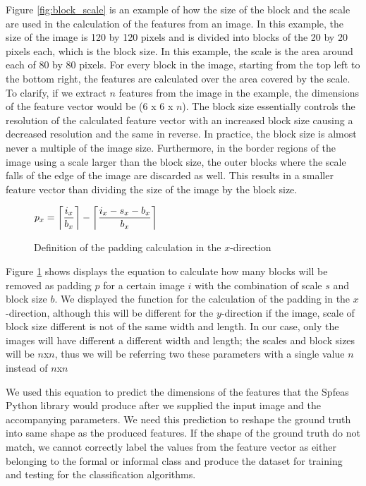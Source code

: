 Figure \ref{fig:block_scale} is an example of how the size of the block and the scale are used in the calculation of the features from an image. In this example, the size of the image is 120 by 120 pixels and is divided into blocks of the 20 by 20 pixels each, which is the block size. In this example, the scale is the area around each of 80 by 80 pixels. For every block in the image, starting from the top left to the bottom right, the features are calculated over the area covered by the scale. To clarify, if we extract $n$ features from the image in the example, the dimensions of the feature vector would be (6 x 6 x $n$). The block size essentially controls the resolution of the calculated feature vector with an increased block size causing a decreased resolution and the same in reverse. In practice, the block size is almost never a multiple of the image size. Furthermore, in the border regions of the image using a scale larger than the block size, the outer blocks where the scale falls of the edge of the image are discarded as well. This results in a smaller feature vector than dividing the size of the image by the block size.

\begin{figure}[h]
	\centering
	$\mathlarger{ p_x = \ceil*{\frac{i_x}{b_x}} - \ceil*{\frac{i_x - s_x - b_x}{b_x}} }$
	\caption{Definition of the padding calculation in the $x$-direction}
	\label{padding}
\end{figure}

Figure \ref{padding} shows displays the equation to calculate how many blocks will be removed as padding $p$ for a certain image $i$ with the combination of scale $s$ and block size $b$. We displayed the function for the calculation of the padding in the $x$-direction, although this will be different for the $y$-direction if the image, scale of block size different is not of the same width and length. In our case, only the images will have different a different width and length; the scales and block sizes will be $n$x$n$, thus we will be referring two these parameters with a single value $n$ instead of $n$x$n$

We used this equation to predict the dimensions of the features that the Spfeas Python library would produce after we supplied the input image and the accompanying parameters. We need this prediction to reshape the ground truth into same shape as the produced features. If the shape of the ground truth do not match, we cannot correctly label the values from the feature vector as either belonging to the formal or informal class and produce the dataset for training and testing for the classification algorithms.

